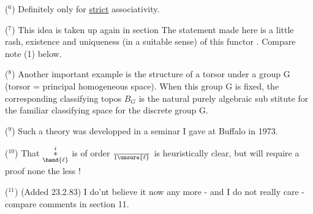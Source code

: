 ($^6$) Definitely only for \uline{strict} associativity.

($^7$) This idea is taken up again in section  The statement made here
is a little rash,   existence and uniqueness (in a
suitable sense) of this functor\hand{,} . Compare note (1) below.

($^8$) Another important example is the structure of a torsor under a group
G (torsor = principal homogeneous space). When this group G is fixed,
the corresponding classifying topos $B_G$ is the natural purely algebraic sub%
\hand{-}stitute for the familiar classifying space for the discrete group G.

($^9$) Such a theory was developped in a seminar I gave at Buffalo in 1973.

($^{10}$) That $\overset{i}{\underset{\hand{\ell}}{*}}$ is of order $\over{1}{\unsure{\ell}}$ is heuristically clear, but will require a
proof none the less !

($^{11}$) (Added 23.2.83) I do'nt believe it now any more - and I do not 
really care - compare comments in section 11.

